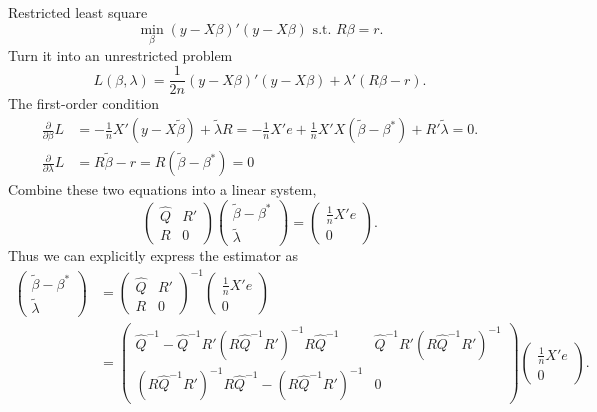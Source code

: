 \documentclass[11pt]{article}
\begin{document}
Restricted least square
\[\min_{\beta}\left(y-X\beta\right)'\left(y-X\beta\right)\mbox{ s.t. }R\beta=r.\]
Turn it into an unrestricted problem
\[L\left(\beta,\lambda\right)=\frac{1}{2n}\left(y-X\beta\right)'\left(y-X\beta\right)+\lambda'\left(R\beta-r\right).\]
The first-order condition 
\begin{align*}
\frac{\partial}{\partial\beta}L & =  -\frac{1}{n}X'\left(y-X\tilde{\beta}\right)+\tilde{\lambda}R=-\frac{1}{n}X'e+\frac{1}{n}X'X\left(\tilde{\beta}-\beta^{*}\right)+R'\tilde{\lambda}=0.\\
\frac{\partial}{\partial\lambda}L & =  R\tilde{\beta}-r=R\left(\tilde{\beta}-\beta^{*}\right)=0
\end{align*}
Combine these two equations into a linear system,
\[
\begin{pmatrix}
\widehat{Q} & R'\\
R & 0
\end{pmatrix}\begin{pmatrix}\tilde{\beta}-\beta^{*}\\
\tilde{\lambda}
\end{pmatrix}=\begin{pmatrix}\frac{1}{n}X'e\\
0
\end{pmatrix}.\]
Thus we can explicitly express the estimator as
\[\begin{aligned}
  \begin{pmatrix}\tilde{\beta}-\beta^{*}\\
\tilde{\lambda}
\end{pmatrix}
& =\begin{pmatrix}\widehat{Q} & R'\\
R & 0
\end{pmatrix}^{-1}
\begin{pmatrix}\frac{1}{n}X'e\\
0
\end{pmatrix}\\
 & =  \begin{pmatrix}\widehat{Q}^{-1}-\widehat{Q}^{-1}R'\left(R\widehat{Q}^{-1}R'\right)^{-1}R\widehat{Q}^{-1} & \widehat{Q}^{-1}R'\left(R\widehat{Q}^{-1}R'\right)^{-1}\\
\left(R\widehat{Q}^{-1}R'\right)^{-1}R\widehat{Q}^{-1}  -\left(R\widehat{Q}^{-1}R'\right)^{-1} & 0
\end{pmatrix}
\begin{pmatrix}\frac{1}{n}X'e\\
0
\end{pmatrix}.\end{aligned}\]
\end{document}
